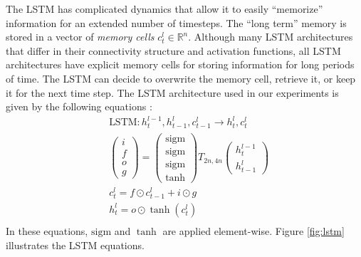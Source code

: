 \documentclass{article} %
\begin{document}
	The LSTM has complicated dynamics that allow it to
	easily ``memorize'' information for an extended number of timesteps.  The
	``long term'' memory is stored in a vector of \emph{memory cells}
	$c^l_t \in \mathbb{R}^n$.  Although many LSTM architectures
	that differ in their connectivity structure and activation functions,
	all LSTM architectures have explicit memory cells for storing
	information for long periods of time.  The LSTM can decide
	to overwrite the memory cell, retrieve it, or keep it for the next time
	step.  The LSTM architecture used in our experiments is given by the
	following equations \cite{graves2013speech}:
	\begin{align*}
	&\text{LSTM} : h^{l-1}_t, h^l_{t-1}, c^l_{t - 1} \rightarrow h^l_t, c^l_t\\
	&\begin{pmatrix}i\\f\\o\\g\end{pmatrix} =
	\begin{pmatrix}\mathrm{sigm}\\\mathrm{sigm}\\\mathrm{sigm}\\\tanh\end{pmatrix}
	T_{2n,4n}\begin{pmatrix}h^{l - 1}_t\\h^l_{t-1}\end{pmatrix}\\
	&c^l_t = f \odot c^l_{t-1} + i \odot g\\
	&h^l_t = o \odot \tanh(c^l_t)\\
	\end{align*}
	In these equations, $\mathrm{sigm}$ and $\tanh$ are applied
	element-wise. Figure \ref{fig:lstm} illustrates the LSTM
	equations.
	
\end{document}
